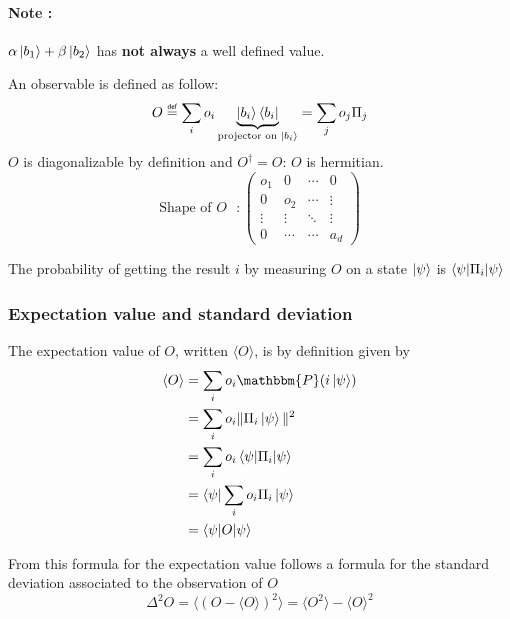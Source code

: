\documentclass{article}
\newcommand\eqdef{\mathrel{\overset{\makebox[0pt]{\mbox{\normalfont\tiny\sffamily def}}}{=}}}
\begin{document}
\paragraph{Note :} $\alpha\ket{b_1} + \beta\ket{b_2}$ has \textbf{not always} a well defined value.

An observable is defined as follow:
\begin{equation}
    O \eqdef \sum_i o_i \underbrace{\ket{b_i}\bra{b_i}}_{\text{projector on $\ket{b_i}$}}
    = \sum_j o_j \Pi_j
\end{equation}
$O$ is diagonalizable by definition and $O^\dagger = O$: $O$ is hermitian.
$$
\text{Shape of $O$ } :
\begin{pmatrix}
    o_1 & 0 & \cdots & 0 \\
    0 & o_2 & \cdots & \vdots \\
    \vdots  & \vdots  & \ddots & \vdots  \\
    0 & \cdots & \cdots & a_d
\end{pmatrix}
$$

The probability of getting the result $i$ by measuring $O$ on a state $\ket{\psi}$ is $\braket{\psi|\Pi_i|\psi}$
\subsubsection{Expectation value and standard deviation}

The expectation value of $O$, written $\langle O\rangle$, is by definition given by
\begin{equation}
    \begin{aligned}
        \langle O\rangle
            & = \sum_i o_i \mathbbm{P}(i\ket{\psi}) \\
            & = \sum_i o_i \|\Pi_i\ket{\psi}\|^2 \\
            & = \sum_i o_i \braket{\psi|\Pi_i|\psi} \\
            & = \bra{\psi}\sum_i o_i \Pi_i \ket{\psi} \\
            & = \braket{\psi | O |\psi}
    \end{aligned}
\end{equation}

From this formula for the expectation value follows a formula for the standard deviation associated to the observation of $O$
\begin{equation}
    \Delta^2 O = \langle(O - \langle O \rangle)^2\rangle = \langle O^2 \rangle - \langle O \rangle^2
\end{equation}
\end{document}
